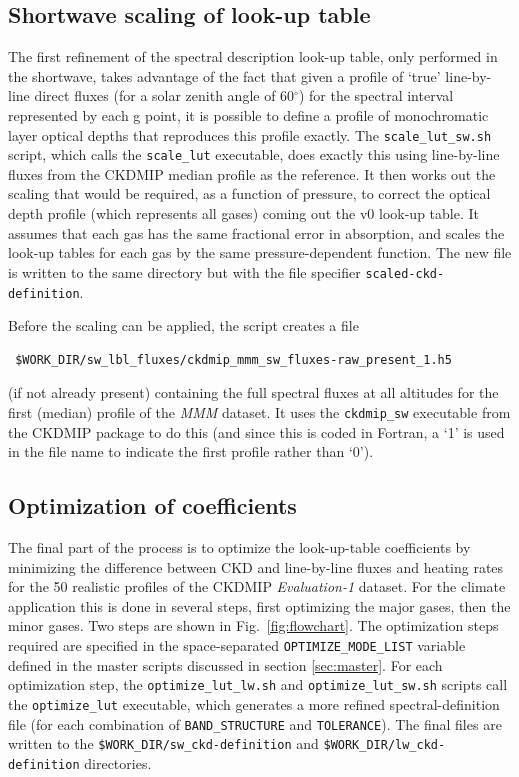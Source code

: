 \documentclass[a4,oneside]{article}
\def\codesize{\small}
\def\codesize{\small}
\def\code#1{{\codesize\texttt{#1}}}
\begin{document}
\subsection{Shortwave scaling of look-up table}
The first refinement of the spectral description look-up table, only
performed in the shortwave, takes advantage of the fact that given a
profile of `true' line-by-line direct fluxes (for a solar zenith angle
of 60$^\circ$) for the spectral interval represented by each g point,
it is possible to define a profile of monochromatic layer optical
depths that reproduces this profile exactly. The
\code{scale\_lut\_sw.sh} script, which calls the \code{scale\_lut}
executable, does exactly this using line-by-line fluxes from the
CKDMIP median profile as the reference.  It then works out the scaling
that would be required, as a function of pressure, to correct the
optical depth profile (which represents all gases) coming out the v0
look-up table. It assumes that each gas has the same fractional error
in absorption, and scales the look-up tables for each gas by the same
pressure-dependent function. The new file is written to the same
directory but with the file specifier \code{scaled-ckd-definition}.

Before the scaling can be applied, the script creates a file
\begin{lstlisting}
 $WORK_DIR/sw_lbl_fluxes/ckdmip_mmm_sw_fluxes-raw_present_1.h5
\end{lstlisting}
(if not already present) containing the full spectral fluxes at all
altitudes for the first (median) profile of the \emph{MMM} dataset. It
uses the \code{ckdmip\_sw} executable from the CKDMIP package to do
this (and since this is coded in Fortran, a `1' is used in the file
name to indicate the first profile rather than `0').

\subsection{Optimization of coefficients}
The final part of the process is to optimize the look-up-table
coefficients by minimizing the difference between CKD and line-by-line
fluxes and heating rates for the 50 realistic profiles of the CKDMIP
\emph{Evaluation-1} dataset. For the climate application this is done
in several steps, first optimizing the major gases, then the minor
gases. Two steps are shown in Fig.\ \ref{fig:flowchart}. The
optimization steps required are specified in the space-separated
\code{OPTIMIZE\_MODE\_LIST} variable defined in the master scripts
discussed in section \ref{sec:master}. For each optimization step, the
\code{optimize\_lut\_lw.sh} and \code{optimize\_lut\_sw.sh} scripts
call the \code{optimize\_lut} executable, which generates a more
refined spectral-definition file (for each combination of
\code{BAND\_STRUCTURE} and \code{TOLERANCE}). The final files are
written to the \code{\$WORK\_DIR/sw\_ckd-definition} and
\code{\$WORK\_DIR/lw\_ckd-definition} directories.
\end{document}
